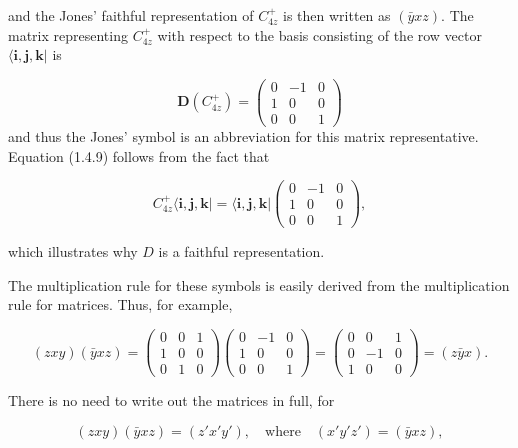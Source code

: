 \documentclass[11pt,a4paper,twoside,openright]{book}
\begin{document}
and the Jones' faithful representation of $C_{4z}^{+}$ is then written as $(\bar{y}xz)$. The matrix representing $C_{4z}^{+}$ with respect to the basis consisting of the row vector $\langle \mathbf{i}, \mathbf{j}, \mathbf{k}|$ is

\begin{equation*}
\mathbf{D}(C_{4z}^{+}) = \begin{pmatrix} 0 & -1 & 0 \\ 1 & 0 & 0 \\ 0 & 0 & 1 \end{pmatrix} \tag{1.4.9}
\end{equation*}
 and thus the Jones' symbol is an abbreviation for this matrix representative. Equation (1.4.9) follows from the fact that

\begin{equation*}
C_{4z}^{+}\langle \mathbf{i}, \mathbf{j}, \mathbf{k}| = \langle \mathbf{i}, \mathbf{j}, \mathbf{k}| \begin{pmatrix} 0 & -1 & 0 \\ 1 & 0 & 0 \\ 0 & 0 & 1 \end{pmatrix}, \tag{1.4.10}
\end{equation*}

which illustrates why $D$ is a faithful representation.

The multiplication rule for these symbols is easily derived from the multiplication rule for matrices. Thus, for example,

\begin{equation*}
(zxy)(\bar{y}xz) = \begin{pmatrix} 0 & 0 & 1 \\ 1 & 0 & 0 \\ 0 & 1 & 0 \end{pmatrix} \begin{pmatrix} 0 & -1 & 0 \\ 1 & 0 & 0 \\ 0 & 0 & 1 \end{pmatrix} = \begin{pmatrix} 0 & 0 & 1 \\ 0 & -1 & 0 \\ 1 & 0 & 0 \end{pmatrix} = (z\bar{y}x). \tag{1.4.11}
\end{equation*}

There is no need to write out the matrices in full, for

\begin{equation*}
(zxy)(\bar{y}xz) = (z'x'y'), \quad \text{where} \quad (x'y'z') = (\bar{y}xz),
\end{equation*}
\end{document}

